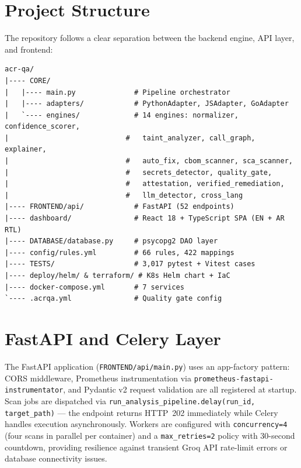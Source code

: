 \section{Project Structure}
\label{sec:project_structure}

The repository follows a clear separation between the backend engine, API layer, and frontend:

\begin{samepage}
\begin{lstlisting}[language={}, basicstyle=\footnotesize\ttfamily, caption={Repository Directory Structure (v5.0.0rc2)}]
acr-qa/
|---- CORE/
|   |---- main.py              # Pipeline orchestrator
|   |---- adapters/            # PythonAdapter, JSAdapter, GoAdapter
|   `---- engines/             # 14 engines: normalizer, confidence_scorer,
|                            #   taint_analyzer, call_graph, explainer,
|                            #   auto_fix, cbom_scanner, sca_scanner,
|                            #   secrets_detector, quality_gate,
|                            #   attestation, verified_remediation,
|                            #   llm_detector, cross_lang
|---- FRONTEND/api/            # FastAPI (52 endpoints)
|---- dashboard/               # React 18 + TypeScript SPA (EN + AR RTL)
|---- DATABASE/database.py     # psycopg2 DAO layer
|---- config/rules.yml         # 66 rules, 422 mappings
|---- TESTS/                   # 3,017 pytest + Vitest cases
|---- deploy/helm/ & terraform/ # K8s Helm chart + IaC
|---- docker-compose.yml       # 7 services
`---- .acrqa.yml               # Quality gate config
\end{lstlisting}
\end{samepage}


\section{FastAPI and Celery Layer}
\label{sec:fastapi_impl}

The FastAPI application \cite{fastapi_framework} (\texttt{FRONTEND/api/main.py}) uses an app-factory pattern: CORS middleware, Prometheus instrumentation via \texttt{prometheus-fastapi-instrumentator}, and Pydantic v2 request validation are all registered at startup. Scan jobs are dispatched via \texttt{run\_analysis\_pipeline.delay(run\_id, target\_path)} --- the endpoint returns HTTP~202 immediately while Celery \cite{celery_project} handles execution asynchronously. Workers are configured with \texttt{concurrency=4} (four scans in parallel per container) and a \texttt{max\_retries=2} policy with 30-second countdown, providing resilience against transient Groq API rate-limit errors or database connectivity issues.



